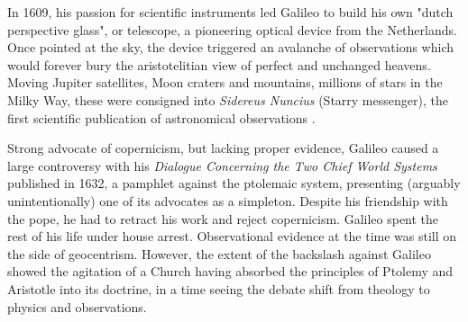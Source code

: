 In 1609, his passion for scientific instruments led Galileo to build his own "dutch perspective glass", or telescope, a pioneering optical device from the Netherlands. Once pointed at the sky, the device triggered an avalanche of observations which would forever bury the aristotelitian view of perfect and unchanged heavens. Moving Jupiter satellites, Moon craters and mountains, millions of stars in the Milky Way, these were consigned into \textit{Sidereus Nuncius} (Starry messenger), the first scientific publication of astronomical observations \citep{galileo1610}.

Strong advocate of copernicism, but lacking proper evidence, Galileo caused a large controversy with his 
\textit{Dialogue Concerning the Two Chief World Systems} published in 1632, a pamphlet against the ptolemaic system, presenting (arguably unintentionally) one of its advocates as a simpleton. Despite his friendship with the pope, he had to retract his work and reject copernicism. Galileo spent the rest of his life under house arrest. Observational evidence at the time was still on the side of geocentrism. However, the extent of the backslash against Galileo showed the agitation of a Church having absorbed the principles of Ptolemy and Aristotle into its doctrine, in a time seeing the debate shift from theology to physics and observations.


